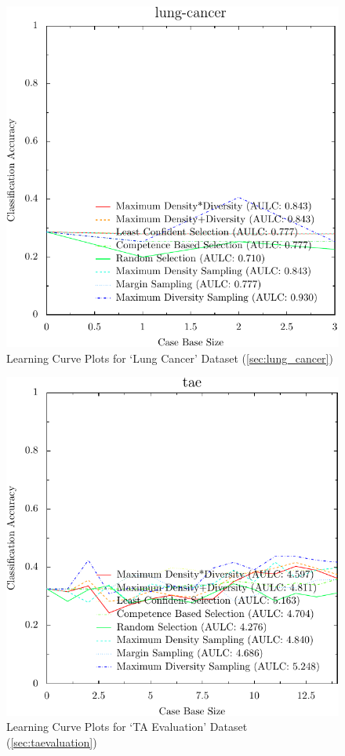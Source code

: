 \documentclass[a4paper,11pt]{report}
\begin{document}
\begin{figure}[h!]
\includegraphics{./Plots/lung-cancer}
\caption{Learning Curve Plots for `Lung Cancer' Dataset (\ref{sec:lung_cancer})}
\end{figure}

\begin{figure}[h!]
\includegraphics{./Plots/tae}
\caption{Learning Curve Plots for `TA Evaluation' Dataset (\ref{sec:taevaluation})}
\end{figure}
\end{document}
